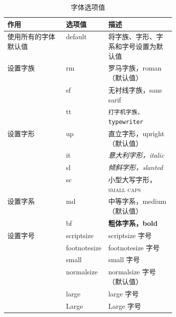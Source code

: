 \begin{table}
\centering
\caption{ 字体选项值}\label{tab:caption-fontval}
\begin{tabular}{l>{\ttfamily}lp{0.4\linewidth}}
\toprule
作用 & {\rm 选项值} & 描述 \\
\midrule
使用所有的字体默认值 & default & 将字族、字形、字系和字号设置为默认值 \\
\midrule
设置字族 & rm & \textrm{罗马字族，roman}（默认值） \\
& sf & \textsf{无衬线字族，sans sarif} \\
& tt & \texttt{打字机字族，typewriter} \\
\midrule
设置字形 & up & \textup{直立字形，upright} （默认值） \\
& it & \textit{意大利字形，italic} \\
& sl & \textsl{倾斜字形，slanted} \\
& sc & \textsc{小型大写字形，small caps} \\
\midrule
设置字系 & md & \textmd{中等字系，medium} （默认值） \\
& bf & \textbf{粗体字系，bold} \\
\midrule
设置字号 & scriptsize & {\scriptsize scriptsize 字号} \\
& footnotesize & {\footnotesize footnotesize 字号} \\
& small & {\small small 字号} \\
& normalsize & {\normalsize normalsize 字号} （默认值） \\
& large & {\large large 字号} \\
& Large & {\Large Large 字号}\\
\bottomrule
\end{tabular}
\end{table}

